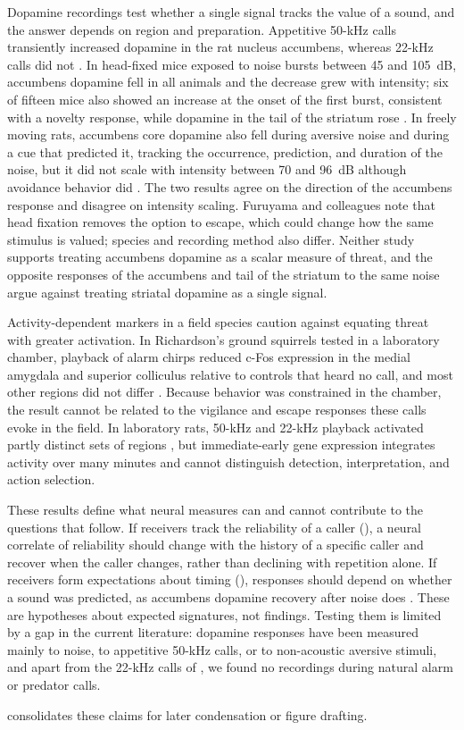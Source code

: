 Dopamine recordings test whether a single signal tracks the value of a sound, and the answer depends on region and preparation. Appetitive 50-kHz calls transiently increased dopamine in the rat nucleus accumbens, whereas 22-kHz calls did not \citep{WilluhnEtAl2014}. In head-fixed mice exposed to noise bursts between 45 and 105~dB, accumbens dopamine fell in all animals and the decrease grew with intensity; six of fifteen mice also showed an increase at the onset of the first burst, consistent with a novelty response, while dopamine in the tail of the striatum rose \citep{FuruyamaEtAl2026}. In freely moving rats, accumbens core dopamine also fell during aversive noise and during a cue that predicted it, tracking the occurrence, prediction, and duration of the noise, but it did not scale with intensity between 70 and 96~dB although avoidance behavior did \citep{GoedhoopEtAl2022}. The two results agree on the direction of the accumbens response and disagree on intensity scaling. Furuyama and colleagues note that head fixation removes the option to escape, which could change how the same stimulus is valued; species and recording method also differ. Neither study supports treating accumbens dopamine as a scalar measure of threat, and the opposite responses of the accumbens and tail of the striatum to the same noise argue against treating striatal dopamine as a single signal.

Activity-dependent markers in a field species caution against equating threat with greater activation. In Richardson's ground squirrels tested in a laboratory chamber, playback of alarm chirps reduced c-Fos expression in the medial amygdala and superior colliculus relative to controls that heard no call, and most other regions did not differ \citep{FreemanEtAl2020}. Because behavior was constrained in the chamber, the result cannot be related to the vigilance and escape responses these calls evoke in the field.
In laboratory rats, 50-kHz and 22-kHz playback activated partly distinct sets of regions \citep{SadanandaEtAl2008}, but immediate-early gene expression integrates activity over many minutes and cannot distinguish detection, interpretation, and action selection.

These results define what neural measures can and cannot contribute to the questions that follow. If receivers track the reliability of a caller (), a neural correlate of reliability should change with the history of a specific caller and recover when the caller changes, rather than declining with repetition alone. If receivers form expectations about timing (), responses should depend on whether a sound was predicted, as accumbens dopamine recovery after noise does \citep{GoedhoopEtAl2022}. These are hypotheses about expected signatures, not findings. Testing them is limited by a gap in the current literature: dopamine responses have been measured mainly to noise, to appetitive 50-kHz calls, or to non-acoustic aversive stimuli, and apart from the 22-kHz calls of \citet{WilluhnEtAl2014}, we found no recordings during natural alarm or predator calls.

 consolidates these claims for later condensation or figure drafting.


